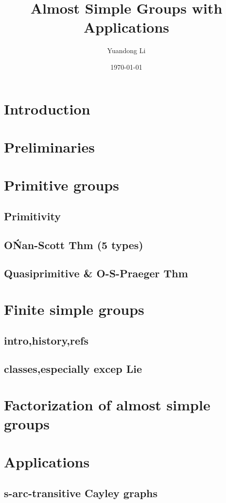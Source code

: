 \documentclass[a4,11pt]{article}
\title{Almost Simple Groups with Applications}
\author{Yuandong Li}
\date{\today}
\begin{document}
\maketitle

\tableofcontents

\section{Introduction}

\section{Preliminaries}

\section{Primitive groups}
\subsection{Primitivity}
\subsection{O\'Nan-Scott Thm (5 types)}
\subsection{Quasiprimitive \& O-S-Praeger Thm}

\section{Finite simple groups}
\subsection{intro,history,refs}
\subsection{classes,especially excep Lie}

\section{Factorization of almost simple groups}

\section{Applications}
\subsection{s-arc-transitive Cayley graphs}
\end{document}
